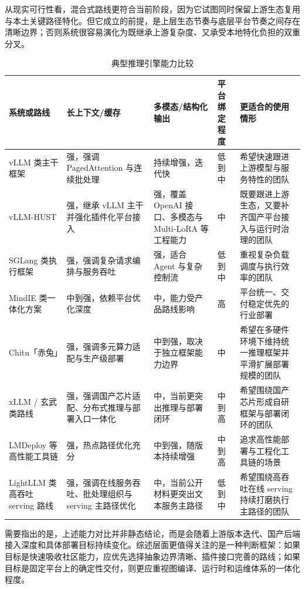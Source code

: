 从现实可行性看，混合式路线更符合当前阶段，因为它试图同时保留上游生态复用与本土关键路径特化。但它成立的前提，是上层生态节奏与底层平台节奏之间存在清晰边界；否则系统很容易演化为既继承上游复杂度、又承受本地特化负担的双重分叉。

\begin{table}[t]
\centering
\footnotesize
\setlength{\tabcolsep}{4pt}
\caption{典型推理引擎能力比较}
\begin{tabularx}{\linewidth}{>{\raggedright\arraybackslash}p{2.1cm}p{1.8cm}p{1.9cm}p{1.8cm}Y}
\toprule
系统或路线 & 长上下文/缓存 & 多模态/结构化输出 & 平台绑定程度 & 更适合的使用情形 \\
\midrule
vLLM 类主干框架 & 强，强调 PagedAttention 与连续批处理\citep{vllm,kwon2023efficient} & 持续增强，迭代快 & 低到中 & 希望快速跟进上游模型与服务特性的团队 \\
vLLM-HUST & 强，继承 vLLM 主干并强化插件化平台接入\citep{vllmhust} & 强，覆盖 OpenAI 接口、多模态与 Multi-LoRA 等工程能力 & 中 & 既要跟进上游生态，又要补齐国产平台接入与运行时治理的团队 \\
SGLang 类执行框架 & 强，强调复杂请求编排与服务吞吐\citep{sglang} & 强，适合 Agent 与复杂控制流 & 低到中 & 重视复杂负载调度与执行效率的团队 \\
MindIE 类一体化方案 & 中到强，依赖平台优化深度\citep{mindie} & 中，能力受产品路线影响 & 高 & 平台统一、交付稳定优先的行业部署 \\
Chitu「赤兔」 & 强，强调多元算力适配与生产级部署\citep{chitu_qingcheng,chitu_github} & 中到强，取决于独立框架能力边界 & 中 & 希望在多硬件环境下维持统一推理框架并平滑扩展部署规模的团队 \\
xLLM / 玄武类路线 & 强，强调国产芯片适配、分布式推理与部署入口一体化\citep{xllm_docs,xuanwu_tsingmao} & 中，当前更突出推理与部署闭环 & 中到高 & 希望围绕国产芯片形成自研框架与部署闭环的团队 \\
LMDeploy 等高性能工具链 & 强，热点路径优化充分\citep{lmdeploy,tensorrtllm} & 中到强，随版本持续增强 & 中到高 & 追求高性能部署与工程化工具链的场景 \\
LightLLM 类高吞吐 serving 路线 & 强，强调在线服务吞吐、批处理组织与 serving 主路径优化\citep{lightllm} & 中，当前公开材料更突出文本服务主路径 & 低到中 & 希望围绕高吞吐在线 serving 持续打磨执行主路径的团队 \\
\bottomrule
\end{tabularx}
\end{table}

需要指出的是，上述能力对比并非静态结论，而是会随着上游版本迭代、国产后端接入深度和具体部署目标持续变化。综述层面更值得关注的是一种判断框架：如果目标是快速吸收社区能力，应优先选择抽象边界清晰、插件接口完善的路线；如果目标是固定平台上的确定性交付，则更应重视图编译、运行时和运维体系的一体化程度。

